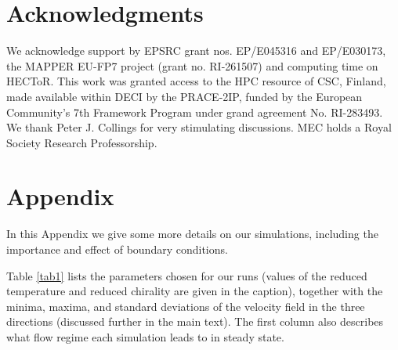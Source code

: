 \documentclass[8.5pt,twoside,twocolumn]{article}
\begin{document}

\section*{Acknowledgments}
We acknowledge support by EPSRC grant nos. EP/E045316 and EP/E030173, 
the MAPPER EU-FP7 project (grant no. RI-261507) and computing time on HECToR.
This work was granted access to the HPC resource of CSC, Finland, made available 
within DECI by the PRACE-2IP, funded by the European Community's 7th Framework 
Program under grand agreement No. RI-283493. We thank Peter J. Collings 
for very stimulating discussions. 
MEC holds a Royal Society Research Professorship.

\appendix
\section*{Appendix}

In this Appendix we give some more details on our simulations,
including the importance and effect of boundary conditions. 

Table \ref{tab1} lists the parameters chosen for our runs (values of
the reduced temperature and reduced chirality are given in the caption),
together with the minima, maxima, and standard deviations of the velocity
field in the three directions (discussed further in the main text). 
The first column also describes what flow regime each simulation
leads to in steady state.
\end{document}
